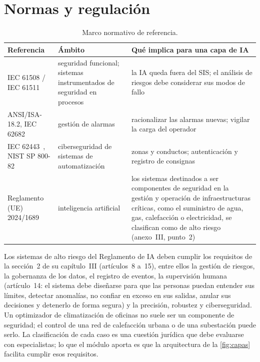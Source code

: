 \section{Normas y regulación}

\begin{table}[htbp]
\centering\small
\begin{tabularx}{\textwidth}{@{}l>{\raggedright\arraybackslash}X>{\raggedright\arraybackslash}X@{}}
\toprule
Referencia & Ámbito & Qué implica para una capa de IA \\
\midrule
IEC 61508 / IEC 61511~\cite{iec61511} & seguridad funcional; sistemas instrumentados de seguridad en procesos & la IA queda fuera del SIS; el análisis de riesgos debe considerar sus modos de fallo \\
ANSI/ISA-18.2, IEC 62682~\cite{isa182} & gestión de alarmas & racionalizar las alarmas nuevas; vigilar la carga del operador \\
IEC 62443~\cite{iec62443}, NIST SP 800-82~\cite{nist} & ciberseguridad de sistemas de automatización & zonas y conductos; autenticación y registro de consignas \\
Reglamento (UE) 2024/1689~\cite{aiact} & inteligencia artificial & los sistemas destinados a ser componentes de seguridad en la gestión y operación de infraestructuras críticas, como el suministro de agua, gas, calefacción o electricidad, se clasifican como de alto riesgo (anexo~III, punto~2) \\
\bottomrule
\end{tabularx}
\caption{Marco normativo de referencia.}
\label{tab:normas}
\end{table}

Los sistemas de alto riesgo del Reglamento de IA deben cumplir los requisitos de la sección~2 de su capítulo~III (artículos~8 a~15), entre ellos la gestión de riesgos, la gobernanza de los datos, el registro de eventos, la supervisión humana (artículo~14: el sistema debe diseñarse para que las personas puedan entender sus límites, detectar anomalías, no confiar en exceso en sus salidas, anular sus decisiones y detenerlo de forma segura) y la precisión, robustez y ciberseguridad. Un optimizador de climatización de oficinas no suele ser un componente de seguridad; el control de una red de calefacción urbana o de una subestación puede serlo. La clasificación de cada caso es una cuestión jurídica que debe evaluarse con especialistas; lo que el módulo aporta es que la arquitectura de la \cref{fig:capas} facilita cumplir esos requisitos.

